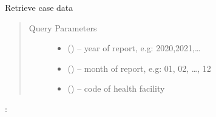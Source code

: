 \documentclass[letterpaper,10pt,english,openany,oneside]{sphinxmanual}
\begin{document}
\begin{fulllineitems}
\label{\detokenize{api/v4:post--api4-Reports-search_patient}}
\sphinxAtStartPar
Retrieve case data
\begin{quote}\begin{description}
\item[{Query Parameters}] \leavevmode\begin{itemize}
\item {} 
\sphinxAtStartPar
{} () – year of report, e.g: 2020,2021,…

\item {} 
\sphinxAtStartPar
{} () – month of report, e.g: 01, 02, …, 12

\item {} 
\sphinxAtStartPar
{} () – code of health facility

\end{itemize}

\end{description}\end{quote}

\sphinxAtStartPar
{}:


\end{fulllineitems}
\end{document}
